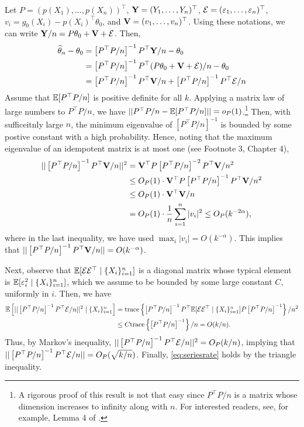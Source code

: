 \documentclass[11pt, A4paper, openany, uplatex]{book}
\begin{document}
Let $P = (p(X_1), \ldots, p(X_n))^\top$, $\mathbf{Y} = (Y_1, \ldots, Y_n)^\top$, $\mathcal{E} = (\varepsilon_1, \ldots, \varepsilon_n)^\top$, $v_i = g_0(X_i) - p(X_i)^\top \theta_0$, and $\mathbf{V} = (v_1, \ldots , v_n)^\top$.
Using these notations, we can write $\mathbf{Y} /n = P \theta_0 + \mathbf{V} + \mathcal{E}$.
Then,
\begin{align*}
	\widehat \theta_n - \theta_0 
	& = \left[P^\top P /n \right]^{-1}P^\top \mathbf{Y} /n - \theta_0 \\
	& = \left[P^\top P /n \right]^{-1}P^\top (P \theta_0 + \mathbf{V} + \mathcal{E}) /n - \theta_0 \\
	& = \left[P^\top P /n \right]^{-1}P^\top \mathbf{V} /n + \left[P^\top P /n \right]^{-1}P^\top \mathcal{E} /n 
\end{align*}
Assume that $\mathbb{E}[P^\top P /n]$ is positive definite for all $k$.
Applying a matrix law of large numbers to $P^\top P /n$, we have $||P^\top P /n - \mathbb{E}[P^\top P /n]|| = o_P(1)$.\footnote{
	A rigorous proof of this result is not that easy since $P^\top P /n$ is a matrix whose dimension increases to infinity along with $n$.
	For interested readers, see, for example, Lemma 4 of \cite{horowitz2004nonparametric}.
}
Then, with sufficeitnly large $n$, the minimum eigenvalue of $\left[P^\top P /n \right]^{-1}$ is bounded by some postive constant with a high probability.
Hence, noting that the maximum eigenvalue of an idempotent matrix is at most one (see Footnote 3, Chapter 4),
\begin{align*}
	||\left[P^\top P /n \right]^{-1}P^\top \mathbf{V} /n||^2 
	& = \mathbf{V}^\top P \left[P^\top P /n \right]^{-2}P^\top \mathbf{V} /n^2 \\
	& \le O_P(1) \cdot \mathbf{V}^\top P \left[P^\top P /n \right]^{-1}P^\top \mathbf{V} /n^2 \\
	& \le O_P(1) \cdot \mathbf{V}^\top \mathbf{V} /n \\
	& = O_P(1) \cdot \frac{1}{n}\sum_{i=1}^n |v_i|^2 \le O_P(k^{-2\alpha}),
\end{align*}
where in the last inequality, we have used $\max_i |v_i| = O(k^{-\alpha})$.
This implies that $||\left[P^\top P /n \right]^{-1}P^\top \mathbf{V} /n|| = O(k^{-\alpha})$.

Next, observe that $\mathbb{E}[\mathcal{E}\mathcal{E}^\top \mid \{X_i\}_{i=1}^n]$ is a diagonal matrix whose typical element is $\mathbb{E}[\varepsilon_i^2 \mid \{X_i\}_{i=1}^n]$, which we assume to be bounded by some large constant $C$, uniformly in $i$.
Then, we have
\begin{align*}
	\mathbb{E}\left[||\left[P^\top P /n \right]^{-1}P^\top \mathcal{E} /n||^2 \mid \{X_i\}_{i=1}^n \right]
	& = \text{trace}\left\{ \left[P^\top P /n \right]^{-1}P^\top \mathbb{E}[\mathcal{E}\mathcal{E}^\top \mid \{X_i\}_{i=1}^n] P \left[P^\top P /n \right]^{-1}\right\}/n^2 \\
	& \le C \text{trace}\left\{ \left[P^\top P /n \right]^{-1} \right\}/n = O(k/n).
\end{align*}
Thus, by Markov's inequality, $||\left[P^\top P /n \right]^{-1}P^\top \mathcal{E} /n||^2 = O_P(k/n)$, implying that $||\left[P^\top P /n \right]^{-1}P^\top \mathcal{E} /n|| = O_P(\sqrt{k/n})$.
Finally, \eqref{eq:seriesrate} holds by the triangle inequality.
\end{document}
